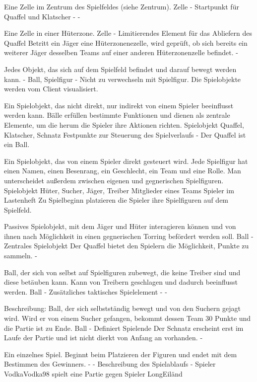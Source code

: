 {Eine Zelle im Zentrum des Spielfeldes (siehe Zentrum).}
{Zelle}
{-}
{Startpunkt für Quaffel und Klatscher}
{-}
{-}

{Eine Zelle in einer Hüterzone.}
{Zelle}
{-}
{Limitierendes Element für das Abliefern des Quaffel}
{Betritt ein Jäger eine Hüterzonenezelle, wird geprüft, ob sich bereits ein weiterer Jäger desselben Teams auf einer anderen Hüterzonenzelle befindet.}
{-}

{Jedes Objekt, das sich auf dem Spielfeld befindet und darauf bewegt werden kann.}
{-}
{Ball, Spielfigur}
{-}
{Nicht zu verwechseln mit Spielfigur.}
{Die Spielobjekte werden vom Client visualisiert.}

{Ein Spielobjekt, das nicht direkt, nur indirekt von einem Spieler beeinflusst werden kann. Bälle erfüllen bestimmte Funktionen und dienen als zentrale Elemente, um die herum die Spieler ihre Aktionen richten.}
{Spielobjekt}
{Quaffel, Klatscher, Schnatz}
{Festpunkte zur Steuerung des Spielverlaufs}
{-}
{Der Quaffel ist ein Ball.}

{Ein Spielobjekt, das von einem Spieler direkt gesteuert wird. Jede Spielfigur hat einen Namen, einen Besenrang, ein Geschlecht, ein Team und eine Rolle. Man unterscheidet außerdem zwischen eigenen und gegnerischen Spielfiguren.}
{Spielobjekt}
{Hüter, Sucher, Jäger, Treiber}
{Mitglieder eines Teams}
{Spieler im Lastenheft}
{Zu Spielbeginn platzieren die Spieler ihre Spielfiguren auf dem Spielfeld.}

{Passives Spielobjekt, mit dem Jäger und Hüter interagieren können und von ihnen nach Möglichkeit in einen gegnerischen Torring befördert werden soll.}
{Ball}
{-}
{Zentrales Spielobjekt}
{Der Quaffel bietet den Spielern die Möglichkeit, Punkte zu sammeln.}
{-}

{Ball, der sich von selbst auf Spielfiguren zubewegt, die keine Treiber sind und diese betäuben kann. Kann von Treibern geschlagen und dadurch beeinflusst werden.}
{Ball}
{-}
{Zusätzliches taktisches Spielelement}
{-}
{-}

{Beschreibung: Ball, der sich selbstständig bewegt und von den Suchern gejagt wird. Wird er von einem Sucher gefangen, bekommt dessen Team 30 Punkte und die Partie ist zu Ende.}
{Ball}
{-}
{Definiert Spielende}
{Der Schnatz erscheint erst im Laufe der Partie und ist nicht dierkt von Anfang an vorhanden.}
{-}

{Ein einzelnes Spiel. Beginnt beim Platzieren der Figuren und endet mit dem Bestimmen des Gewinners.}
{-}
{-}
{Beschreibung des Spielablaufs}
{-}
{Spieler \glqq{}VodkaVodka98\grqq{} spielt eine Partie gegen Spieler \glqq{}LongEiländ\grqq{}}

